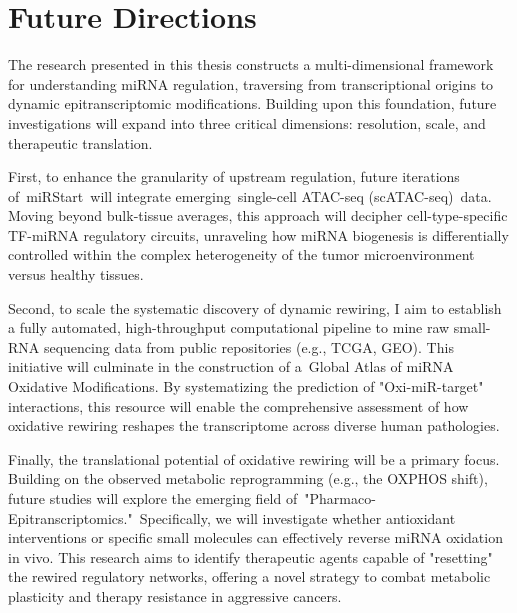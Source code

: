 \section{Future Directions}

The research presented in this thesis constructs a multi-dimensional framework for understanding miRNA regulation, traversing from transcriptional origins to dynamic epitranscriptomic modifications. Building upon this foundation, future investigations will expand into three critical dimensions: resolution, scale, and therapeutic translation.

First, to enhance the granularity of upstream regulation, future iterations of~miRStart~will integrate emerging~single-cell ATAC-seq (scATAC-seq)~data. Moving beyond bulk-tissue averages, this approach will decipher cell-type-specific TF-miRNA regulatory circuits, unraveling how miRNA biogenesis is differentially controlled within the complex heterogeneity of the tumor microenvironment versus healthy tissues.

Second, to scale the systematic discovery of dynamic rewiring, I aim to establish a fully automated, high-throughput computational pipeline to mine raw small-RNA sequencing data from public repositories (e.g., TCGA, GEO). This initiative will culminate in the construction of a~Global Atlas of miRNA Oxidative Modifications. By systematizing the prediction of "Oxi-miR-target" interactions, this resource will enable the comprehensive assessment of how oxidative rewiring reshapes the transcriptome across diverse human pathologies.

Finally, the translational potential of oxidative rewiring will be a primary focus. Building on the observed metabolic reprogramming (e.g., the OXPHOS shift), future studies will explore the emerging field of~"Pharmaco-Epitranscriptomics."~Specifically, we will investigate whether antioxidant interventions or specific small molecules can effectively reverse miRNA oxidation in vivo. This research aims to identify therapeutic agents capable of "resetting" the rewired regulatory networks, offering a novel strategy to combat metabolic plasticity and therapy resistance in aggressive cancers.
